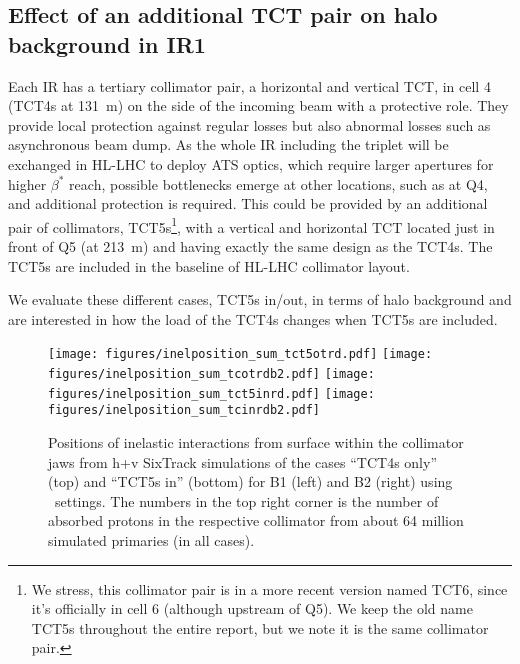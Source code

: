 
\subsection{Effect of an additional TCT pair on halo background in IR1}

Each IR has a tertiary collimator pair, a horizontal and vertical TCT, in cell 4 (TCT4s at 131~m) on the side of the incoming beam with a protective role. They provide local protection against regular losses but also abnormal losses such as asynchronous beam dump. As the whole IR including the triplet will be exchanged in HL-LHC to deploy ATS optics, which require larger apertures for higher $\beta^*$ reach, possible bottlenecks emerge at other locations, such as at Q4, and additional protection is required. This could be provided by an additional pair of collimators, TCT5s\footnote{We stress, this collimator pair is in a more recent version named TCT6, since it's officially in cell 6 (although upstream of Q5). We keep the old name TCT5s throughout the entire report, but we note it is the same collimator pair.}, with a vertical and horizontal TCT located just in front of Q5 (at 213~m) and having exactly the same design as the TCT4s. The TCT5s are included in the baseline of HL-LHC collimator layout.

We evaluate these different cases, TCT5s in/out, in terms of halo background and are interested in how the load of the TCT4s changes when TCT5s are included.  

\begin{figure}%
\begin{center}
\texttt{[image: figures/inelposition\_sum\_tct5otrd.pdf]}
\texttt{[image: figures/inelposition\_sum\_tcotrdb2.pdf]}
\texttt{[image: figures/inelposition\_sum\_tct5inrd.pdf]}
\texttt{[image: figures/inelposition\_sum\_tcinrdb2.pdf]}
\end{center}
\vspace{-0.6cm}
 \caption{Positions of inelastic interactions from surface within the collimator jaws from h+v SixTrack simulations of the cases ``TCT4s only'' (top) and ``TCT5s in'' (bottom) for B1 (left) and B2 (right) using \twosigmaret~settings. The numbers in the top right corner is the number of absorbed protons in the respective collimator from about 64 million simulated primaries (in all cases).
  \label{inelHLtctsInOut}}
\end{figure}

